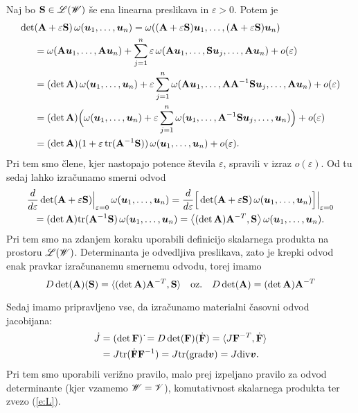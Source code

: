 Naj bo $\mathbf S\in\mathscr L(\mathscr W)$ še ena linearna preslikava in $\varepsilon>0$. Potem je
\begin{align*}
	\det&(\mathbf A+\varepsilon \mathbf S)\,\omega(\boldsymbol u_1,\dots,\boldsymbol u_n)=
	\omega((\mathbf A+\varepsilon \mathbf S)\boldsymbol u_1,\dots,(\mathbf A+\varepsilon \mathbf S)\boldsymbol u_n)\\
	&=\omega(\mathbf A\boldsymbol u_1,\dots,\mathbf A\boldsymbol u_n)+
	\sum_{j=1}^n\varepsilon\,\omega(\mathbf A\boldsymbol u_1,\dots,\mathbf S\boldsymbol u_j,\dots,\mathbf A\boldsymbol u_n)+o(\varepsilon)\\
	&=(\det \mathbf A)\,\omega(\boldsymbol u_1,\dots,\boldsymbol u_n)+\varepsilon
	\sum_{j=1}^n\omega(\mathbf A\boldsymbol u_1,\dots,\mathbf A\mathbf A^{-1}\mathbf S\boldsymbol u_j,\dots,\mathbf A\boldsymbol u_n)+o(\varepsilon)\\
	&=(\det \mathbf A)\Big(\omega(\boldsymbol u_1,\dots,\boldsymbol u_n)+\varepsilon
	\sum_{j=1}^n\omega(\boldsymbol u_1,\dots,\mathbf A^{-1}\mathbf S\boldsymbol u_j,\dots,\boldsymbol u_n)\Big)+o(\varepsilon)\\
	&=(\det \mathbf A)(1+\varepsilon\,\mathrm{tr}(\mathbf A^{-1}\mathbf S))\,\omega(\boldsymbol u_1,\dots,\boldsymbol u_n)+o(\varepsilon).
\end{align*}
Pri tem smo člene, kjer nastopajo potence števila $\varepsilon$, spravili
v izraz $o(\varepsilon)$. Od tu sedaj lahko izračunamo smerni odvod
\begin{multline*}
	\frac{d}{d\varepsilon}\det(\mathbf A+\varepsilon \mathbf S)\Big|_{\varepsilon=0}
	\,\omega(\boldsymbol u_1,\dots,\boldsymbol u_n)=
	\frac{d}{d\varepsilon}\Big[\det(\mathbf A+\varepsilon \mathbf S)
	\,\omega(\boldsymbol u_1,\dots,\boldsymbol u_n)\Big]\Big|_{\varepsilon=0}\\
	=(\det \mathbf A)\mathrm{tr}(\mathbf A^{-1}\mathbf S)\,\omega(\boldsymbol u_1,\dots,\boldsymbol u_n)=
	\big<(\det \mathbf A)\mathbf A^{-T}, \mathbf S\big>\,\omega(\boldsymbol u_1,\dots,\boldsymbol u_n).
\end{multline*}
Pri tem smo na zdanjem koraku uporabili definicijo skalarnega produkta na prostoru $\mathscr L(\mathscr W)$.
Determinanta je odvedljiva preslikava, zato je krepki odvod enak pravkar izračunanemu
smernemu odvodu, torej imamo
\begin{equation} \label{e:odvodet}
	D\det(\mathbf A)(\mathbf S)=\langle(\det \mathbf A)\mathbf A^{-T},\mathbf S\rangle
	\quad\textrm{oz.}\quad D\det(\mathbf A)=(\det \mathbf A)\mathbf A^{-T}
\end{equation}

Sedaj imamo pripravljeno vse, da izračunamo materialni časovni odvod jacobijana:
\begin{align}
	\dot{J}&=(\det\mathbf F)\,\dot{}=D\det(\mathbf F)(\dot{\mathbf F})=\langle J\mathbf F^{-T},\dot{\mathbf F}\rangle
	\nonumber \\ &= J\mathrm{tr}(\dot{\mathbf F}\mathbf F^{-1}) = J\mathrm{tr}(\mathrm{grad}\boldsymbol v)=J\mathrm{div}\boldsymbol v. \label{e:dotJ}
\end{align}
Pri tem smo uporabili verižno pravilo, malo prej izpeljano pravilo za odvod determinante
(kjer vzamemo $\mathscr W=\mathscr V$), komutativnost skalarnega produkta ter zvezo (\ref{e:L}).


